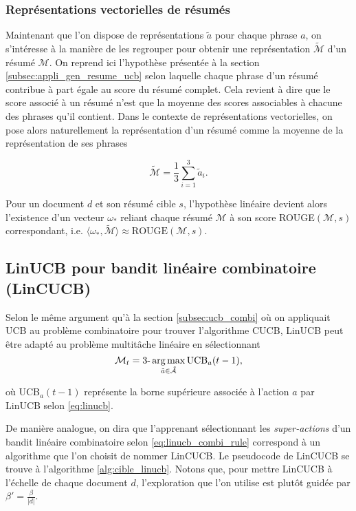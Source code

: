 \subsubsection*{Représentations vectorielles de résumés}

Maintenant que l'on dispose de représentations $\tilde{a}$ pour chaque phrase 
$a$, on s'intéresse à la manière de les regrouper pour obtenir une 
représentation $\tilde{\mathcal{M}}$ d'un résumé $\mathcal{M}$.
On reprend ici l'hypothèse présentée à la section \ref{subsec:appli_gen_resume_ucb}
selon laquelle chaque phrase d'un résumé contribue à part égale au 
score du résumé complet.
Cela revient à dire que le score associé à un résumé n'est que la moyenne 
des scores associables à chacune des phrases qu'il contient.
Dans le contexte de représentations vectorielles, on pose 
alors naturellement la représentation d'un résumé 
comme la moyenne de la représentation de ses phrases 

\begin{equation*}
\tilde{\mathcal{M}} = \frac{1}{3}\sum_{i=1}^3 \tilde{a}_i.
\end{equation*}

Pour un document $d$ et son résumé cible $s$, l'hypothèse linéaire 
devient alors l'existence d'un vecteur $\omega_*$ reliant chaque résumé $\mathcal{M}$
à son score ROUGE$(\mathcal{M}, s)$ correspondant, i.e. 
$\langle \omega_*, \tilde{\mathcal{M}} \rangle \approx \text{ROUGE}(\mathcal{M}, s)$.

\subsection{LinUCB pour bandit linéaire combinatoire (LinCUCB)}

Selon le même argument qu'à la section \ref{subsec:ucb_combi} où on appliquait UCB
au problème combinatoire pour trouver l'algorithme CUCB, 
LinUCB peut être adapté au problème multitâche linéaire en 
sélectionnant 
\begin{equation}
    \mathcal{M}_t = \text{3-}\operatorname*{arg\,max}_{\tilde{a} \in \tilde{\mathcal{A}}} \text{UCB}_a(t-1),
    \label{eq:linucb_combi_rule}
\end{equation}

où UCB$_a(t-1)$ représente la borne supérieure associée à l'action $a$ par LinUCB selon 
\eqref{eq:linucb}.

De manière analogue, on dira que l'apprenant sélectionnant les \textit{super-actions}
d'un bandit linéaire combinatoire selon \eqref{eq:linucb_combi_rule} correspond 
à un algorithme que l'on choisit de nommer LinCUCB.
Le pseudocode de LinCUCB se trouve à l'algorithme 
\ref{alg:cible_linucb}.
Notons que, pour mettre LinCUCB à l'échelle de chaque document $d$, 
l'exploration que l'on utilise est plutôt guidée par $\beta' = \frac{\beta}{|d|}$.

